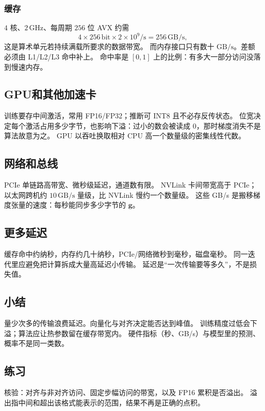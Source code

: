 \subsubsection{缓存}

$4$ 核、$2\,\mathrm{GHz}$、每周期 $256$ 位 AVX 约需
\[
4\times 256\,\mathrm{bit}\times 2\times 10^9/\mathrm{s}=256\,\mathrm{GB/s},
\]
这是算术单元若持续满载所要求的数据带宽。
而内存接口只有数十 $\mathrm{GB/s}$。差额必须由 L1/L2/L3 命中补上。
命中率是 $[0,1]$ 上的比例：有多大一部分访问没落到慢速内存。

\subsection{GPU和其他加速卡}

训练要存中间激活，常用 FP16/FP32；推断可 INT8 且不必存反传状态。
位宽决定每个激活占用多少字节，也影响下溢：过小的数会被读成 $0$，那时梯度消失不是算法故意为之。
GPU 以吞吐换取相对 CPU 高一个数量级的密集线性代数。

\subsection{网络和总线}

PCIe 单链路高带宽、微秒级延迟，通道数有限。
NVLink 卡间带宽高于 PCIe；以太网跨机约 $10\,\mathrm{GB/s}$ 量级，比 NVLink 慢约一个数量级。
这些 GB/s 是搬移梯度张量的速度：每秒能同步多少字节的 $\bm{g}$。

\subsection{更多延迟}

缓存命中约纳秒，内存约几十纳秒，PCIe/网络微秒到毫秒，磁盘毫秒。
同一迭代里应避免把计算拆成大量高延迟小传输。
延迟是“一次传输要等多久”，不是损失值。

\subsection{小结}

量少次多的传输浪费延迟。向量化与对齐决定能否达到峰值。
训练精度过低会下溢；算法应让热参数留在缓存带宽内。
硬件指标（秒、GB/s）与模型里的预测、概率不是同一类数。

\subsection{练习}

核验：对齐与非对齐访问、固定步幅访问的带宽，以及 FP16 累积是否溢出。
溢出指中间和超出该格式能表示的范围，结果不再是正确的点积。

